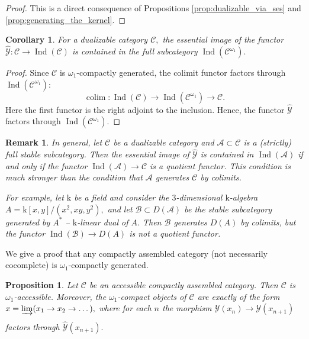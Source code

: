 \documentclass[11pt,leqno]{amsart}
\newtheorem{prop}[theo]{Proposition}
\newtheorem{cor}[theo]{Corollary}
\newtheorem{remark}[theo]{Remark}
\numberwithin{equation}{section}
\DeclareMathOperator*{\colim}{colim}
\newcommand{\indlim}[1][]{\mathop{\varinjlim}\limits_{#1}}
\newcommand{\xto}{\xrightarrow}
\newcommand{\mk}{\mathrm k}
\newcommand{\cA}{{\mathcal A}}
\newcommand{\cB}{{\mathcal B}}
\newcommand{\cC}{{\mathcal C}}
\newcommand{\cY}{{\mathcal Y}}
\newcommand{\Ind}{\operatorname{Ind}}
\begin{document}
\begin{proof}This is a direct consequence of Propositions \ref{prop:dualizable_via_ses} and \ref{prop:generating_the_kernel}.
\end{proof}

\begin{cor}\label{cor:hat_Y_into_Ind_C_omega_1} For a dualizable category $\cC,$ the essential image of the functor $\hat{\cY}:\cC\to\Ind(\cC)$ is contained in the full subcategory $\Ind(\cC^{\omega_1}).$\end{cor}

\begin{proof}Since $\cC$ is $\omega_1$-compactly generated, the colimit functor factors through $\Ind(\cC^{\omega_1}):$
$$\colim:\Ind(\cC)\to\Ind(\cC^{\omega_1})\to\cC.$$
Here the first functor is the right adjoint to the inclusion. Hence, the functor $\hat{\cY}$ factors through $\Ind(\cC^{\omega_1}).$
\end{proof}

\begin{remark}In general, let $\cC$ be a dualizable category and $\cA\subset\cC$ is a (strictly) full stable subcategory. Then the essential image of $\hat{\cY}$ is contained in $\Ind(\cA)$ if and only if the functor $\Ind(\cA)\to\cC$ is a quotient functor. This condition is much stronger than the condition that $\cA$ generates $\cC$ by colimits.

For example, let $\mk$ be a field and consider the $3$-dimensional $\mk$-algebra $A=\mk[x,y]/(x^2,xy,y^2),$ and let $\cB\subset D(\cA)$ be the stable subcategory generated by $A^*$ -- $\mk$-linear dual of $A.$ Then $\cB$ generates $D(A)$ by colimits, but the functor $\Ind(\cB)\to D(A)$ is not a quotient functor.\end{remark}

We give a proof that any compactly assembled category (not necessarily cocomplete) is $\omega_1$-compactly generated.

\begin{prop}\label{prop:comp_ass_omega_1_gen} Let $\cC$ be an accessible compactly assembled category. Then $\cC$ is $\omega_1$-accessible. Moreover, the $\omega_1$-compact objects of $\cC$ are exactly of the form $x=\indlim[](x_1\to x_2\to\dots),$ where for each $n$ the morphism $\cY(x_n)\to\cY(x_{n+1})$ factors through $\hat{\cY}(x_{n+1}).$\end{prop}
\end{document}
